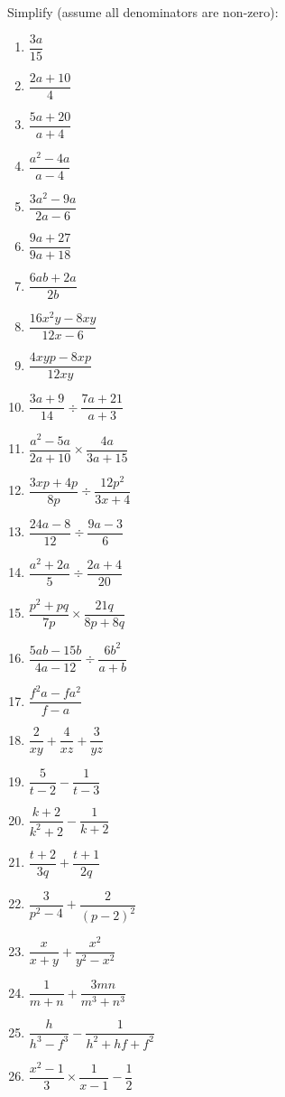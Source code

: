 \begin{exercises}{}
{
Simplify (assume all denominators are non-zero):
\begin{multicols}{2}
\begin{enumerate}[itemsep=5pt, label=\textbf{\arabic*}. ] 
\item$\dfrac{3a}{15}$
\item $\dfrac{2a+10}{4}$
\item $\dfrac{5a+20}{a+4}$
\item $\dfrac{{a}^{2}-4a}{a-4}$
\item $\dfrac{3{a}^{2}-9a}{2a-6}$
\item $\dfrac{9a+27}{9a+18}$
\item $\dfrac{6ab+2a}{2b}$
\item $\dfrac{16{x}^{2}y-8xy}{12x-6}$
\item $\dfrac{4xyp-8xp}{12xy}$
\item $\dfrac{3a+9}{14}÷\dfrac{7a+21}{a+3}$
\item $\dfrac{{a}^{2}-5a}{2a+10} \times \dfrac{4a}{3a+15}$
\item $\dfrac{3xp+4p}{8p}÷\dfrac{12{p}^{2}}{3x+4}$
\item $\dfrac{24a-8}{12}÷\dfrac{9a-3}{6}$
\item $\dfrac{{a}^{2}+2a}{5}÷\dfrac{2a+4}{20}$
\item $\dfrac{{p}^{2}+pq}{7p} \times \dfrac{21q}{8p+8q}$
\item $\dfrac{5ab-15b}{4a-12}÷\dfrac{6{b}^{2}}{a+b}$
\item $\dfrac{{f}^{2}a-f{a}^{2}}{f-a}$
\item $\dfrac{2}{xy} + \dfrac{4}{xz}+\dfrac{3}{yz}$
\item $\dfrac{5}{t-2} - \dfrac{1}{t-3}$
\item $\dfrac{k+2}{k^{2} +2} - \dfrac{1}{k+2}$
\item $\dfrac{t+2}{3q} + \dfrac{t+1}{2q}$
\item $\dfrac{3}{p^{2}-4}+\dfrac{2}{(p-2)^{2}}$
\item $\dfrac{x}{x+y}+\dfrac{x^{2}}{y^{2} - x^{2}}$
\item $\dfrac{1}{m+n} + \dfrac{3mn}{m^{3} + n^{3}}$
\item $\dfrac{h}{h^{3}-f^{3}} - \dfrac{1}{h^{2} + hf + f^{2}}$
\item $\dfrac{{x}^{2}-1}{3}\times\dfrac{1}{x-1}-\dfrac{1}{2}$
\end{enumerate}
\end{multicols}

}
\end{exercises}

